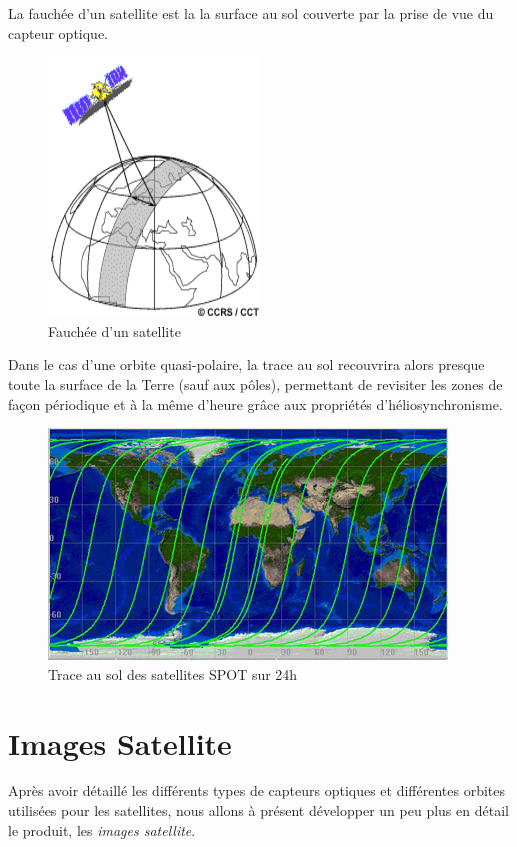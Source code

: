\documentclass[a4paper, 11pt]{report}
\begin{document}
La fauchée d'un satellite est la la surface au sol couverte par la prise de vue du capteur optique.
\begin{figure}[H]
	\begin{center}
		\includegraphics[scale=0.4]{Images/Swath.png}
		\caption{Fauchée d'un satellite}
	\end{center}
\end{figure}
Dans le cas d'une orbite quasi-polaire, la trace au sol recouvrira alors presque toute la surface de la Terre (sauf aux pôles), permettant de revisiter les zones de façon périodique et à la même d'heure grâce aux propriétés d'héliosynchronisme.
\begin{figure}[H]
	\begin{center}
		\includegraphics[scale=0.5]{Images/Trace_Sol_SPOT.jpg}
		\caption{Trace au sol des satellites SPOT sur 24h}
	\end{center}
\end{figure}
\section{Images Satellite}
Après avoir détaillé les différents types de capteurs optiques et différentes orbites utilisées pour les satellites, nous allons à présent développer un peu plus en détail le produit, les \emph{images satellite}.
\end{document}
